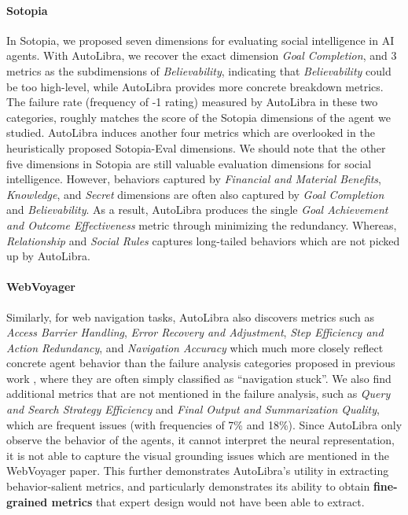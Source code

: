 \paragraph{Sotopia} In Sotopia, we \citep{zhousotopia} proposed seven dimensions for evaluating social intelligence in AI agents.
With AutoLibra, we recover the exact dimension \emph{Goal Completion}, and 3 metrics as the subdimensions of \emph{Believability},
indicating that \textit{Believability} could be too high-level, while AutoLibra provides more concrete breakdown metrics. 
The failure rate (frequency of -1 rating) measured by AutoLibra in these two categories,
roughly matches the score of the Sotopia dimensions of the agent we studied.
AutoLibra induces another four metrics which are overlooked in the heuristically proposed Sotopia-Eval dimensions.
We should note that the other five dimensions in Sotopia are still valuable evaluation dimensions for social intelligence.
However, behaviors captured by \emph{Financial and Material Benefits}, \emph{Knowledge}, and \emph{Secret} dimensions are often also
captured by \textit{Goal Completion} and \textit{Believability}.
As a result, AutoLibra produces the single \textit{Goal Achievement and Outcome Effectiveness} metric through minimizing the redundancy.
Whereas, \textit{Relationship} and \textit{Social Rules} captures long-tailed behaviors which are not picked up by AutoLibra.



\paragraph{WebVoyager} Similarly, for web navigation tasks, AutoLibra also discovers metrics such as \textit{Access Barrier Handling},
\textit{Error Recovery and Adjustment},
\textit{Step Efficiency and Action Redundancy},
and \textit{Navigation Accuracy} 
which much more closely reflect concrete agent behavior than the failure analysis categories proposed in previous work
\citep{he2024webvoyager,zhou2024proposeragentevaluatorpaeautonomousskilldiscovery}, where they are often simply classified as ``navigation stuck''.
We also find additional metrics that are not mentioned in the failure analysis, such as \textit{Query and Search Strategy Efficiency} and
\textit{Final Output and Summarization Quality}, which are frequent issues (with frequencies of 7\% and 18\%).
Since AutoLibra only observe the behavior of the agents, it cannot interpret the neural representation,
it is not able to capture the visual grounding issues which are mentioned in the WebVoyager paper.
This further demonstrates AutoLibra's utility in extracting behavior-salient metrics,
and particularly demonstrates its ability to obtain \textbf{fine-grained metrics} that expert design would not have been able to extract. 
